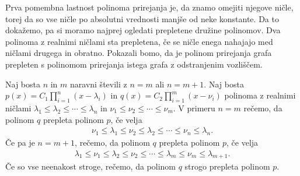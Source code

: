 Prva pomembna lastnost polinoma prirejanja je, da znamo omejiti njegove ničle, torej da so vse ničle po absolutni vrednosti manjše od neke konstante. Da to dokažemo, pa si moramo najprej ogledati prepletene družine polinomov. Dva polinoma z realnimi ničlami sta prepletena, če se ničle enega nahajajo med ničlami drugega in obratno. Pokazali bomo, da je polinom prirejanja grafa prepleten s polinomom prirejanja istega grafa z odstranjenim vozliščem.

\begin{definicija}\label{prepletena-polinoma}
    Naj bosta \(n\) in \(m\) naravni števili z \(n=m\) ali \(n=m+1\). Naj bosta \(p(x) = C_1 \prod_{i=1}^n (x-\lambda_i)\) in \(q(x) = C_2 \prod_{i=1}^m (x-\nu_i)\) polinoma z realnimi ničlami \(\lambda_1 \leq \lambda_2 \leq \cdots \leq \lambda_n\) in \(\nu_1 \leq \nu_2 \leq \cdots \leq \nu_m\). V primeru \(n=m\) rečemo, da polinom \(q\) prepleta polinom \(p\), če velja
    \begin{align*}
        \nu_1 \leq \lambda_1 \leq \nu_2 \leq \lambda_2 \leq \cdots \leq \nu_n \leq \lambda_n.
    \end{align*}
    Če pa je \(n=m+1\), rečemo, da polinom \(q\) prepleta polinom \(p\), če velja
    \begin{align*}
        \lambda_1 \leq \nu_1 \leq \lambda_2 \leq \nu_2 \leq \cdots \leq \lambda_m \leq \nu_m \leq \lambda_{m+1}.
    \end{align*}
    Če so vse neenakost stroge, rečemo, da polinom \(q\) strogo prepleta polinom \(p\).
\end{definicija}

